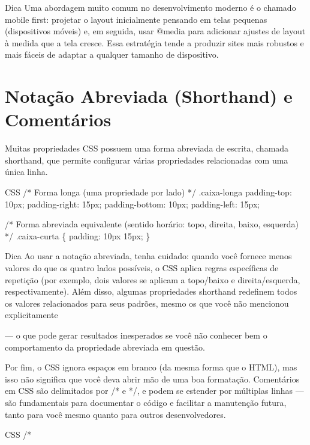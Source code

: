\begin{infobox}{Dica}
Uma abordagem muito comum no desenvolvimento moderno é o chamado mobile first: projetar o layout inicialmente pensando em telas pequenas (dispositivos móveis) e, em seguida, usar @media para adicionar ajustes de layout à medida que a tela cresce. Essa estratégia tende a produzir sites mais robustos e mais fáceis de adaptar a qualquer tamanho de dispositivo.
\end{infobox}

\section{Notação Abreviada (Shorthand) e Comentários}

Muitas propriedades CSS possuem uma forma abreviada de escrita, chamada shorthand, que permite configurar várias propriedades relacionadas com uma única linha.

\begin{codebox}{CSS}
/* Forma longa (uma propriedade por lado) */
.caixa-longa {
  padding-top: 10px;
  padding-right: 15px;
  padding-bottom: 10px;
  padding-left: 15px;
}
\end{codebox}

/* Forma abreviada equivalente (sentido horário: topo, direita, baixo, esquerda) */ .caixa-curta \{ padding: 10px 15px; \}

\begin{infobox}{Dica}
Ao usar a notação abreviada, tenha cuidado: quando você fornece menos valores do que os quatro lados possíveis, o CSS aplica regras específicas de repetição (por exemplo, dois valores se aplicam a topo/baixo e direita/esquerda, respectivamente). Além disso, algumas propriedades shorthand redefinem todos os valores relacionados para seus padrões, mesmo os que você não mencionou explicitamente
\end{infobox}

— o que pode gerar resultados inesperados se você não conhecer bem o comportamento da propriedade abreviada em questão.

Por fim, o CSS ignora espaços em branco (da mesma forma que o HTML), mas isso não significa que você deva abrir mão de uma boa formatação. Comentários em CSS são delimitados por /* e */, e podem se estender por múltiplas linhas — são fundamentais para documentar o código e facilitar a manutenção futura, tanto para você mesmo quanto para outros desenvolvedores.

\begin{codebox}{CSS}
/*
\end{codebox}

